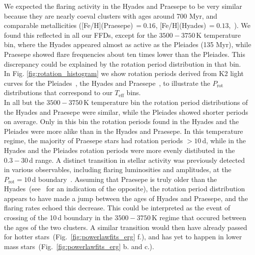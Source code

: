 \documentclass{aa}
\begin{document}
We expected the flaring activity in the Hyades and Praesepe to be very similar because they are nearly coeval clusters with ages around 700 Myr, and comparable metallicities ([Fe/H](Praesepe)\,$=0.16$, [Fe/H](Hyades)\,$=0.13$,~\citealt{netopil_metallicities_2016}). We found this reflected in all our FFDs, except for the $3500-3750$\,K temperature bin, where the Hyades appeared almost as active as the Pleiades (135 Myr), while Praesepe showed flare frequencies about ten times lower than the Pleiades. This discrepancy could be explained by the rotation period distribution in that bin. 
\\
In Fig. \ref{fig:rotation_histogram} we show rotation periods derived from K2 light curves for the Pleiades~\citep{rebull_pleiadesrot_2016}, the Hyades and Praesepe~\citep{douglas2019}, to illustrate the $P_\mathrm{rot}$ distributions that correspond to our $T_\mathrm{eff}$ bins.
\\
In all but the $3500-3750$\,K temperature bin the rotation period distributions of the Hyades and Praesepe were similar, while the Pleiades showed shorter periods on average. Only in this bin the rotation periods found in the Hyades and the Pleiades were more alike than in the Hyades and Praesepe. In this temperature regime, the majority of Praesepe stars had rotation periods $>10$\,d, while in the Hyades and the Pleiades rotation periods were more evenly distibuted in the $0.3-30$\,d range. A distinct transition in stellar activity was previously detected in various observables, including flaring luminosities and amplitudes, at the $P_\mathrm{rot}=10$\,d boundary~\citep{stelzer2016, lu2019}. Assuming that Praesepe is truly older than the Hyades~(see~\citet{douglas2019} for an indication of the opposite), the rotation period distribution appears to have made a jump between the ages of Hyades and Praesepe, and the flaring rates echoed this decrease. This could be interpreted as the event of crossing of the 10\,d boundary in the $3500-3750$\,K regime that occured between the ages of the two clusters. A similar transition would then have already passed for hotter stars~(Fig.~\ref{fig:powerlawfits_erg} f.), and has yet to happen in lower mass stars~(Fig.~\ref{fig:powerlawfits_erg} b. and c.).
\end{document}
